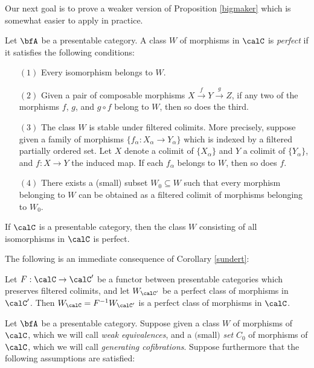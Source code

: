 \begin{Model Categories}
Our next goal is to prove a weaker version of Proposition \ref{bigmaker} which is somewhat easier to apply in practice.

\begin{definition}\label{perfequiv}
Let $\bfA$ be a presentable category. A class $W$ of morphisms in $\calC$ is {\it perfect}
if it satisfies the following conditions:

\begin{itemize}
\item[$(1)$] Every isomorphism belongs to $W$.
\item[$(2)$] Given a pair of composable morphisms $X \stackrel{f}{\rightarrow} Y \stackrel{g}{\rightarrow} Z$, if any two of the morphisms $f$, $g$, and $g \circ f$ belong to $W$, then so does the third.
\item[$(3)$] The class $W$ is stable under filtered colimits. More precisely, suppose given a family of morphisms $\{ f_{\alpha}: X_{\alpha} \rightarrow Y_{\alpha} \}$ which is indexed by a filtered partially ordered set. Let $X$ denote a colimit of $\{ X_{\alpha} \}$ and $Y$ a colimit of
$\{ Y_{\alpha} \}$, and $f: X \rightarrow Y$ the induced map. If each $f_{\alpha}$ belongs to $W$, then so does $f$. 
\item[$(4)$] There exists a (small) subset $W_0 \subseteq W$ such that every morphism belonging to $W$ can be obtained as a filtered colimit of morphisms belonging to $W_0$.
\end{itemize}
\end{definition}

\begin{example}
If $\calC$ is a presentable category, then the class $W$ consisting of all isomorphisms in $\calC$
is perfect.
\end{example}

The following is an immediate consequence of Corollary \ref{sundert}:

\begin{corollary}\label{perfpull}
Let $F: \calC \rightarrow \calC'$ be a functor between presentable categories which preserves filtered colimits, and let $W_{\calC'}$ be a perfect class of morphisms in $\calC'$. Then
$W_{\calC} = F^{-1} W_{\calC'}$ is a perfect class of morphisms in $\calC$.
\end{corollary}

\begin{proposition}\label{goot}
Let $\bfA$ be a presentable category. Suppose given a class $W$ of morphisms of $\calC$, which we will call {\it weak equivalences}, and a $($small$)$ {\em set} $C_0$ of morphisms of $\calC$, which we will call {\it generating cofibrations}. Suppose furthermore that the following assumptions are satisfied:


\end{proposition}
\end{Model Categories}
